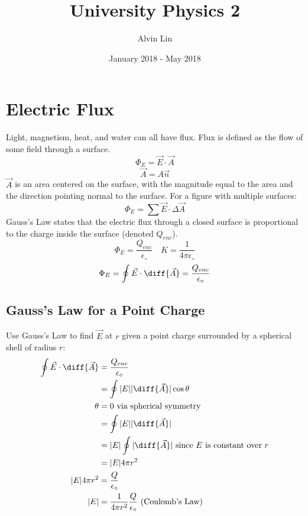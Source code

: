 \documentclass{math}
\title{University Physics 2}
\author{Alvin Lin}
\date{January 2018 - May 2018}
\begin{document}
\maketitle

\section*{Electric Flux}
Light, magnetism, heat, and water can all have flux. Flux is defined as the flow
of some field through a surface.
\[ \Phi_{E} = \vec{E}\cdot\vec{A} \]
\[ \vec{A} = A\vec{n} \]
\( \vec{A} \) is an area centered on the surface, with the magnitude equal to
the area and the direction pointing normal to the surface. For a figure with
multiple surfaces:
\[ \Phi_E = \sum\vec{E}\cdot\Delta\vec{A} \]
Gauss's Law states that the electric flux through a closed surface is
proportional to the charge inside the surface (denoted \( Q_{enc} \)).
\[ \Phi_E = \frac{Q_{enc}}{\epsilon_{\circ}} \quad
  K = \frac{1}{4\pi\epsilon_{\circ}} \]
\[ \Phi_E = \oint\vec{E}\cdot\diff{\vec{A}} =
  \frac{Q_{enc}}{\epsilon_{\circ}} \]

\subsection*{Gauss's Law for a Point Charge}
\begin{center}
\end{center}
Use Gauss's Law to find \( \vec{E} \) at \( r \) given a point charge surrounded
by a spherical shell of radius \( r \):
\begin{align*}
  \oint\vec{E}\cdot\diff{\vec{A}} &= \frac{Q_{enc}}{\epsilon_{\circ}} \\
  &= \oint|E||\diff{\vec{A}}|\cos\theta \\
  \theta &= 0 \text{ via spherical symmetry} \\
  &= \oint|E||\diff{\vec{A}}| \\
  &= |E|\oint|\diff{\vec{A}}| \text{ since } E \text{ is constant over } r \\
  &= |E|4\pi r^2 \\
  |E|4\pi r^2 &= \frac{Q}{\epsilon_{\circ}} \\
  |E| &= \frac{1}{4\pi r^2}\frac{Q}{\epsilon_{\circ}} \text{ (Coulomb's Law)}
\end{align*}
\end{document}
